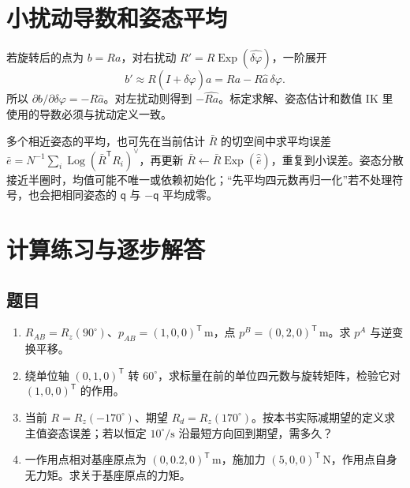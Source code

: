 \section{小扰动导数和姿态平均}
若旋转后的点为 $b=Ra$，对右扰动 $R'=R\operatorname{Exp}(\widehat{\delta\varphi})$，一阶展开
\[
 b'\approx R(I+\widehat{\delta\varphi})a
 =Ra-R\widehat a\,\delta\varphi.
\]
所以 $\partial b/\partial\delta\varphi=-R\widehat a$。对左扰动则得到 $-\widehat{Ra}$。标定求解、姿态估计和数值 IK 里使用的导数必须与扰动定义一致。

多个相近姿态的平均，也可先在当前估计 $\bar R$ 的切空间中求平均误差 $\bar e=N^{-1}\sum_i\operatorname{Log}(\bar R^\mathsf TR_i)^\vee$，再更新 $\bar R\leftarrow\bar R\operatorname{Exp}(\widehat{\bar e})$，重复到小误差。姿态分散接近半圈时，均值可能不唯一或依赖初始化；“先平均四元数再归一化”若不处理符号，也会把相同姿态的 $\mathsf q$ 与 $-\mathsf q$ 平均成零。

\section{计算练习与逐步解答}
\subsection*{题目}
\begin{enumerate}
\item $R_{AB}=R_z(90^\circ)$、$p_{AB}=(1,0,0)^\mathsf T\,\mathrm m$，点 $p^B=(0,2,0)^\mathsf T\,\mathrm m$。求 $p^A$ 与逆变换平移。
\item 绕单位轴 $(0,1,0)^\mathsf T$ 转 $60^\circ$，求标量在前的单位四元数与旋转矩阵，检验它对 $(1,0,0)^\mathsf T$ 的作用。
\item 当前 $R=R_z(-170^\circ)$、期望 $R_d=R_z(170^\circ)$。按本书实际减期望的定义求主值姿态误差；若以恒定 $10^\circ/\mathrm s$ 沿最短方向回到期望，需多久？
\item 一作用点相对基座原点为 $(0,0.2,0)^\mathsf T\,\mathrm m$，施加力 $(5,0,0)^\mathsf T\,\mathrm N$，作用点自身无力矩。求关于基座原点的力矩。
\end{enumerate}
